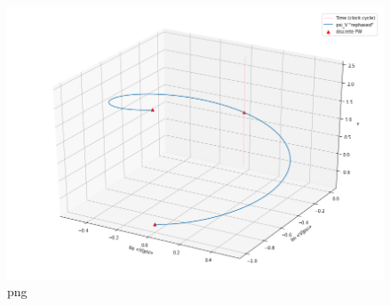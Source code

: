 \begin{figure}
\centering
\includegraphics[width=\textwidth/2]{img/psi_V.png}
\caption[(from notebook)]{png}
\end{figure}
